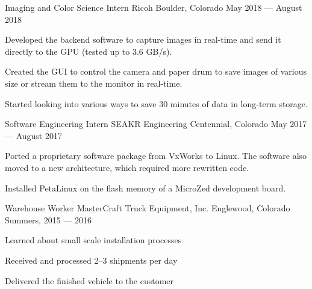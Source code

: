 \begin{cventries}
  \cventry%
    {Imaging and Color Science Intern}
    {Ricoh}
    {Boulder, Colorado}
    {May 2018 --- August 2018}
    {%
      \begin{cvitems}
         \item Developed the backend software to capture images in real-time and
               send it directly to the GPU (tested up to 3.6 GB/s).
         \item Created the GUI to control the camera and paper drum to save
               images of various size or stream them to the monitor in real-time.
         \item Started looking into various ways to save 30 minutes of data in
               long-term storage.
      \end{cvitems}
    }
  \cventry%
    {Software Engineering Intern}
    {SEAKR Engineering}
    {Centennial, Colorado}
    {May 2017 --- August 2017}
    {%
      \begin{cvitems}
         \item Ported a proprietary software package from VxWorks to Linux. The software also
               moved to a new architecture, which required more rewritten code.
         \item Installed PetaLinux on the flash memory of a MicroZed development board.
      \end{cvitems}
    }
  \cventry%
    {Warehouse Worker}
    {MasterCraft Truck Equipment, Inc.}
    {Englewood, Colorado}
    {Summers, 2015 --- 2016}
    {%
      \begin{cvitems}
         \item Learned about small scale installation processes
         \item Received and processed 2--3 shipments per day
         \item Delivered the finished vehicle to the customer
      \end{cvitems}
    }
\end{cventries}
